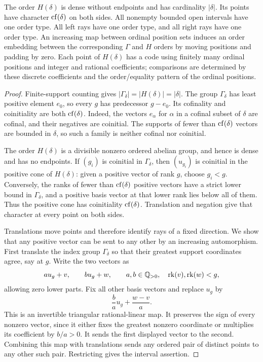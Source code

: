 \begin{lemma}
\label{found:order-basic}
The order $H(\delta)$ is dense without endpoints and has cardinality
$|\delta|$. Its points have character $\operatorname{cf}(\delta)$ on both sides.
All nonempty bounded open intervals have one order type. All left
rays have one order type, and all right rays have one order type.
An increasing map between ordinal position sets induces an order
embedding between the corresponding $\Gamma$ and $H$ orders by
moving positions and padding by zero. Each point of $H(\delta)$ has
a code using finitely many ordinal positions and integer and
rational coefficients; comparisons are determined by these discrete
coefficients and the order/equality pattern of the ordinal positions.
\end{lemma}

\begin{proof}
Finite-support counting gives
$|\Gamma_\delta|=|H(\delta)|=|\delta|$. The group
$\Gamma_\delta$ has least positive element $e_0$, so every $g$ has
predecessor $g-e_0$. Its cofinality and coinitiality are both
$\operatorname{cf}(\delta)$. Indeed, the vectors $e_\alpha$ for $\alpha$ in a
cofinal subset of $\delta$ are cofinal, and their negatives are
coinitial. The supports of fewer than $\operatorname{cf}(\delta)$ vectors are
bounded in $\delta$, so such a family is neither cofinal nor
coinitial.

The order $H(\delta)$ is a divisible nonzero ordered abelian group,
and hence is dense and has no endpoints. If $(g_i)$ is coinitial
in $\Gamma_\delta$, then $(u_{g_i})$ is coinitial in the positive
cone of $H(\delta)$: given a positive vector of rank $g$, choose
$g_i<g$. Conversely, the ranks of fewer than $\operatorname{cf}(\delta)$ positive
vectors have a strict lower bound in $\Gamma_\delta$, and a positive
basis vector at that lower rank lies below all of them. Thus the
positive cone has coinitiality $\operatorname{cf}(\delta)$. Translation and
negation give that character at every point on both sides.

Translations move points and therefore identify rays of a fixed
direction. We show that any positive vector can be sent to any
other by an increasing automorphism. First translate the index
group $\Gamma_\delta$ so that their greatest support coordinates
agree, say at $g$. Write the two vectors as
\[
a u_g+v,\qquad b u_g+w,
\qquad a,b\in\mathbb Q_{>0},\quad \operatorname{rk}(v),\operatorname{rk}(w)<g,
\]
allowing zero lower parts. Fix all other basis vectors and replace
$u_g$ by
\[
\frac ba u_g+\frac{w-v}{a}.
\]
This is an invertible triangular rational-linear map. It preserves
the sign of every nonzero vector, since it either fixes the greatest
nonzero coordinate or multiplies its coefficient by $b/a>0$.
It sends the first displayed vector to the second. Combining this
map with translations sends any ordered pair of distinct points to
any other such pair. Restricting gives the interval assertion.


\end{proof}
